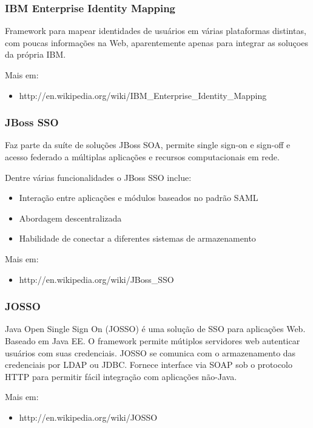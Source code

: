 \documentclass[11pt]{article}
\begin{document}
\subsubsection{IBM Enterprise Identity Mapping}

Framework para mapear identidades de usuários em várias plataformas distintas,
com poucas informações na Web, aparentemente apenas para integrar as soluçoes
da própria IBM.

Mais em:
\begin{itemize}
  \item{http://en.wikipedia.org/wiki/IBM\_Enterprise\_Identity\_Mapping}
\end{itemize}

\subsubsection{JBoss SSO}

Faz parte da suíte de soluções JBoss SOA, permite single sign-on e sign-off e
acesso federado a múltiplas aplicações e recursos computacionais em rede.

Dentre várias funcionalidades o JBoss SSO inclue:

\begin{itemize}
  \item{Interação entre aplicações e módulos baseados no padrão SAML}
  \item{Abordagem descentralizada}
  \item{Habilidade de conectar a diferentes sistemas de armazenamento}
\end{itemize}

Mais em:
\begin{itemize}
  \item{http://en.wikipedia.org/wiki/JBoss\_SSO}
\end{itemize}

\subsubsection{JOSSO}

Java Open Single Sign On (JOSSO) é uma solução de SSO para aplicações Web.
Baseado em Java EE. O framework permite mútiplos servidores web autenticar
usuários com suas credenciais. JOSSO se comunica com o armazenamento das
credenciais por LDAP ou JDBC. Fornece interface via SOAP sob o protocolo HTTP
para permitir fácil integração com aplicações não-Java.

Mais em:
\begin{itemize}
  \item{http://en.wikipedia.org/wiki/JOSSO}
\end{itemize}
\end{document}
